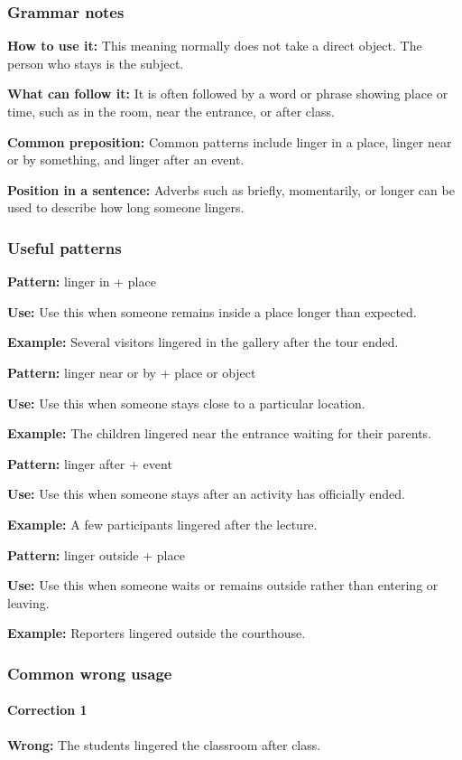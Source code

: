 \documentclass[11pt]{article}
\begin{document}
\subsubsection{Grammar notes}
\textbf{How to use it:} This meaning normally does not take a direct object. The person who stays is the subject.

\textbf{What can follow it:} It is often followed by a word or phrase showing place or time, such as in the room, near the entrance, or after class.

\textbf{Common preposition:} Common patterns include linger in a place, linger near or by something, and linger after an event.

\textbf{Position in a sentence:} Adverbs such as briefly, momentarily, or longer can be used to describe how long someone lingers.

\subsubsection{Useful patterns}
\textbf{Pattern:} linger in + place

\textbf{Use:} Use this when someone remains inside a place longer than expected.

\textbf{Example:} Several visitors lingered in the gallery after the tour ended.

\textbf{Pattern:} linger near or by + place or object

\textbf{Use:} Use this when someone stays close to a particular location.

\textbf{Example:} The children lingered near the entrance waiting for their parents.

\textbf{Pattern:} linger after + event

\textbf{Use:} Use this when someone stays after an activity has officially ended.

\textbf{Example:} A few participants lingered after the lecture.

\textbf{Pattern:} linger outside + place

\textbf{Use:} Use this when someone waits or remains outside rather than entering or leaving.

\textbf{Example:} Reporters lingered outside the courthouse.

\subsubsection{Common wrong usage}
\paragraph{Correction 1}
\textbf{Wrong:} The students lingered the classroom after class.
\end{document}
